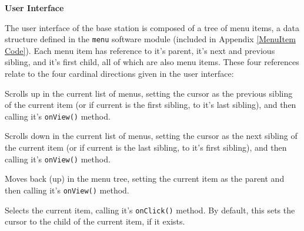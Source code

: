 \documentclass[journal,compsoc]{IEEEtran}
\begin{document}
\textbf{User Interface}

The user interface of the base station is composed of a tree of menu items, a data structure defined in the \lstinline[columns=fixed]{menu} software module (included in Appendix \ref{MenuItem Code}). Each menu item has reference to it's parent, it's next and previous sibling, and it's first child, all of which are also menu items. These four references relate to the four cardinal directions given in the user interface:

\begin{LaTeXdescription}
	\item[Up] Scrolls up in the current list of menus, setting the cursor as the previous sibling of the current item (or if current is the first sibling, to it's last sibling), and then calling it's \lstinline[columns=fixed]{onView()} method.
    \item[Down] Scrolls down in the current list of menus, setting the cursor as the next sibling of the current item (or if current is the last sibling, to it's first sibling), and then calling it's \lstinline[columns=fixed]{onView()} method.
    \item[Left] Moves back (up) in the menu tree, setting the current item as the parent and then calling it's \lstinline[columns=fixed]{onView()} method.
    \item[Right] Selects the current item, calling it's \lstinline[columns=fixed]{onClick()} method. By default, this sets the cursor to the child of the current item, if it exists.
\end{LaTeXdescription}
\end{document}

